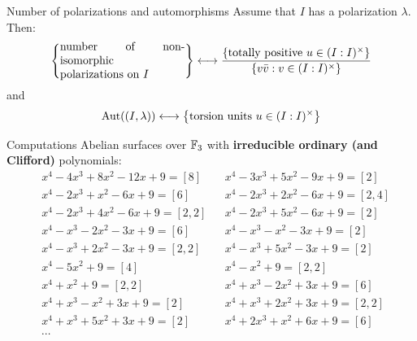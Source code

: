 \documentclass{beamer}
\DeclareMathOperator{\ICM}{ICM}
\begin{document}
\begin{frame}{Number of polarizations and automorphisms}
  Assume that $I$ has a polarization $\lambda$. Then:
\pause
  \[
    \set{\parbox[p]{11em}{number of non-isomorphic \\ polarizations on $I$}} \longleftrightarrow
    \dfrac{\set{ \text{totally positive $u\in (I:I)^\times$} }}{\set{v\bar v : v\in (I:I)^\times}}
  \]
\pause
  and 
  \[
    \operatorname{Aut}((I,\lambda)) \longleftrightarrow
    \left\lbrace\text{torsion units }u\in (I:I)^\times\right\rbrace
  \]
\end{frame}

\begin{frame}{Computations}
  Abelian surfaces over $\mathbb{F}_3$ with \textbf{irreducible ordinary (and Clifford)} polynomials:
\pause
  \begin{align*}
    & x^4 - 4x^3 + 8x^2 - 12x + 9 = [ 8 ] &
    & x^4 - 3x^3 + 5x^2 - 9x + 9 = [ 2 ]\\
    & x^4 - 2x^3 + x^2 - 6x + 9 = [ 6 ] &
    & x^4 - 2x^3 + 2x^2 - 6x + 9 = [ 2, 4 ]\\
    & x^4 - 2x^3 + 4x^2 - 6x + 9 = [ 2, 2 ] &
    & x^4 - 2x^3 + 5x^2 - 6x + 9 = [ 2 ]\\
    & x^4 - x^3 - 2x^2 - 3x + 9 = [ 6 ] &
    & x^4 - x^3 - x^2 - 3x + 9 = [ 2 ]\\
    & x^4 - x^3 + 2x^2 - 3x + 9 = [ 2, 2 ] &
    & x^4 - x^3 + 5x^2 - 3x + 9 = [ 2 ]\\
    & x^4 - 5x^2 + 9 = [ 4 ] &
    & x^4 - x^2 + 9 = [ 2, 2 ]\\
    & x^4 + x^2 + 9 = [ 2, 2 ] &
    & x^4 + x^3 - 2x^2 + 3x + 9 = [ 6 ]\\
    & x^4 + x^3 - x^2 + 3x + 9 = [ 2 ] &
    & x^4 + x^3 + 2x^2 + 3x + 9 = [ 2, 2 ]\\
    & x^4 + x^3 + 5x^2 + 3x + 9 = [ 2 ] &
    & x^4 + 2x^3 + x^2 + 6x + 9 = [ 6 ]\\
    & \cdots
  \end{align*}
\end{frame}

% 

% 
\end{document}

